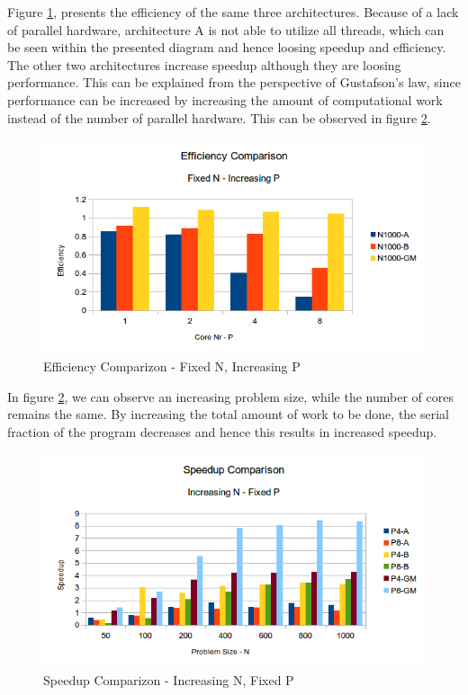 \documentclass[conference]{IEEEtran}
\begin{document}
Figure \ref{pic:omp_efficiency_comp}, presents the efficiency of the same three architectures. Because of a lack of parallel hardware, architecture A is not able to utilize all threads, which can be seen within the presented diagram and hence loosing speedup and efficiency. The other two architectures increase speedup although they are loosing performance. This can be explained from the perspective of Gustafson’s law, since performance can be increased by increasing the amount of computational work instead of the number of parallel hardware. This can be observed in figure \ref{pic:omp_speedup_comp2}. 

\begin{figure}[h]
  \centering
  \includegraphics[scale=0.55]{pic/omp_efficiency_comp.png} 
  \caption{Efficiency Comparizon - Fixed N, Increasing P}
  \label{pic:omp_efficiency_comp}
\end{figure}

In figure \ref{pic:omp_speedup_comp2}, we can observe an increasing problem size, while the number of cores remains the same. By increasing the total amount of work to be done, the serial fraction of the program decreases and hence this results in increased speedup.

\begin{figure}[h]
  \centering
  \includegraphics[scale=0.55]{pic/omp_speedup2_comp.png} 
  \caption{Speedup Comparizon - Increasing N, Fixed P}
  \label{pic:omp_speedup_comp2}
\end{figure}
\end{document}
